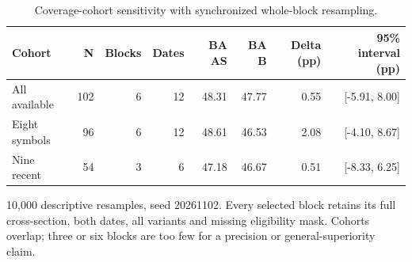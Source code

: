\begin{table}[htbp]
\centering\small
\caption{Coverage-cohort sensitivity with synchronized whole-block resampling.}
\label{tab:r2_dependence}
\setlength{\tabcolsep}{3.5pt}
\begin{tabular}{lrrrrrrr}
\hline
Cohort & N & Blocks & Dates & BA AS & BA B & Delta (pp) & 95\% interval (pp) \\
\hline
All available & 102 & 6 & 12 & 48.31 & 47.77 & 0.55 & [-5.91, 8.00] \\
Eight symbols & 96 & 6 & 12 & 48.61 & 46.53 & 2.08 & [-4.10, 8.67] \\
Nine recent & 54 & 3 & 6 & 47.18 & 46.67 & 0.51 & [-8.33, 6.25] \\
\hline
\end{tabular}
\par\smallskip\footnotesize 10,000 descriptive resamples, seed 20261102. Every selected block retains its full cross-section, both dates, all variants and missing eligibility mask. Cohorts overlap; three or six blocks are too few for a precision or general-superiority claim.
\end{table}
